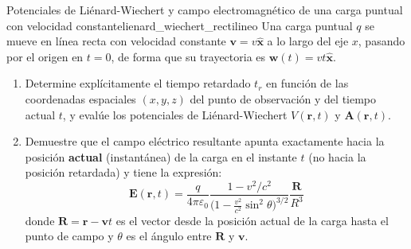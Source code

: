 \documentclass[11pt,a4paper]{book}
\newcommand{\xhat}{\hat{\bm{x}}}
\newcommand{\Evec}{\bm{E}}
\newcommand{\Avec}{\bm{A}}
\begin{document}
\begin{ejercicio}{Potenciales de Liénard-Wiechert y campo electromagnético de una carga puntual con velocidad constante}{lienard_wiechert_rectilineo}
Una carga puntual $q$ se mueve en línea recta con velocidad constante $\bm{v} = v\xhat$ a lo largo del eje $x$, pasando por el origen en $t = 0$, de forma que su trayectoria es $\bm{w}(t) = vt\xhat$.
\begin{enumerate}[label=\alph*)]
    \item Determine explícitamente el tiempo retardado $t_r$ en función de las coordenadas espaciales $(x,y,z)$ del punto de observación y del tiempo actual $t$, y evalúe los potenciales de Liénard-Wiechert $V(\bm{r},t)$ y $\Avec(\bm{r},t)$.
    \item Demuestre que el campo eléctrico resultante apunta exactamente hacia la posición \textbf{actual} (instantánea) de la carga en el instante $t$ (no hacia la posición retardada) y tiene la expresión:
    \begin{equation*}
        \Evec(\bm{r},t) = \frac{q}{4\pi\varepsilon_0} \frac{1 - v^2/c^2}{\big(1 - \frac{v^2}{c^2}\sin^2\theta\big)^{3/2}} \frac{\bm{R}}{R^3}
    \end{equation*}
    donde $\bm{R} = \bm{r} - \bm{v}t$ es el vector desde la posición actual de la carga hasta el punto de campo y $\theta$ es el ángulo entre $\bm{R}$ y $\bm{v}$.
\end{enumerate}
\end{ejercicio}
\end{document}
